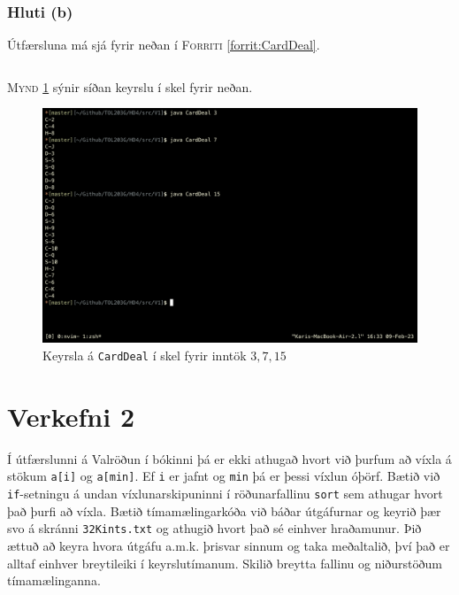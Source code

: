 \documentclass[12pt, a4paper, hidelinks]{article}
\begin{document}
\subsubsection*{Hluti (b)}
Útfærsluna má sjá fyrir neðan í \textsc{Forriti} \ref{forrit:CardDeal}.

\inputminted[linenos]{java}{../src/V1/CardDeal.java}

\bigskip
\noindent
\textsc{Mynd} \ref{mynd:CardDeal_keyrsla} sýnir síðan keyrslu í skel fyrir neðan.

\begin{figure}[H]
    \centering
    \includegraphics[width=\textwidth]{img/CardDeal_keyrsla.png}
    \caption{Keyrsla á \texttt{CardDeal} í skel fyrir inntök $3, 7, 15$}
    \label{mynd:CardDeal_keyrsla}
\end{figure}

\newpage

\section*{Verkefni 2}
Í útfærslunni á Valröðun í bókinni þá er ekki athugað hvort við þurfum að víxla á stökum \texttt{a[i]} og \texttt{a[min]}.
Ef \texttt{i} er jafnt og \texttt{min} þá er þessi víxlun óþörf. Bætið við \texttt{if}-setningu á undan víxlunarskipuninni
í röðunarfallinu \texttt{sort} sem athugar hvort það þurfi að víxla. Bætið tímamælingarkóða við báðar útgáfurnar og keyrið þær
svo á skránni \texttt{32Kints.txt} og athugið hvort það sé einhver hraðamunur. Þið ættuð að keyra hvora útgáfu a.m.k. þrisvar
sinnum og taka meðaltalið, því það er alltaf einhver breytileiki í keyrslutímanum. Skilið breytta fallinu og niðurstöðum
tímamælinganna.
\end{document}
